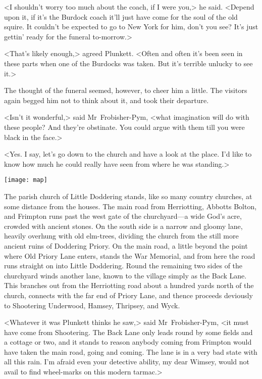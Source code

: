 <I shouldn't worry too much about the coach, if I were you,> he said. <Depend upon it, if it's the Burdock coach it'll just have come for the soul of the old squire. It couldn't be expected to go to New York for him, don't you see? It's just gettin' ready for the funeral to-morrow.>

<That's likely enough,> agreed Plunkett. <Often and often it's been seen in these parts when one of the Burdocks was taken. But it's terrible unlucky to see it.>

The thought of the funeral seemed, however, to cheer him a little. The visitors again begged him not to think about it, and took their departure.

<Isn't it wonderful,> said Mr~Frobisher-Pym, <what imagination will do with these people? And they're obstinate. You could argue with them till you were black in the face.>

<Yes. I say, let's go down to the church and have a look at the place. I'd like to know how much he could really have seen from where he was standing.>

\begin{sidewaysfigure}
\texttt{[image: map]}%
\end{sidewaysfigure}


The parish church of Little Doddering stands, like so many country churches, at some distance from the houses. The main road from Herriotting, Abbotts Bolton, and Frimpton runs past the west gate of the churchyard—a wide God's acre, crowded with ancient stones. On the south side is a narrow and gloomy lane, heavily overhung with old elm-trees, dividing the church from the still more ancient ruins of Doddering Priory. On the main road, a little beyond the point where Old Priory Lane enters, stands the War Memorial, and from here the road runs straight on into Little Doddering. Round the remaining two sides of the churchyard winds another lane, known to the village simply as the Back Lane. This branches out from the Herriotting road about a hundred yards north of the church, connects with the far end of Priory Lane, and thence proceeds deviously to Shootering Underwood, Hamsey, Thripsey, and Wyck.

<Whatever it was Plunkett thinks he saw,> said Mr~Frobisher-Pym, <it must have come from Shootering. The Back Lane only leads round by some fields and a cottage or two, and it stands to reason anybody coming from Frimpton would have taken the main road, going and coming. The lane is in a very bad state with all this rain. I'm afraid even your detective ability, my dear Wimsey, would not avail to find wheel-marks on this modern tarmac.>


